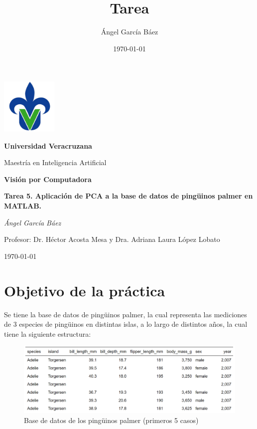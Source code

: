 \documentclass[11pt, letterpaper]{article}
\title{\bfseries Tarea}
\author{Ángel García Báez}
\date{\today}
\begin{document}
	
	\begin{titlepage}
		\centering
		\includegraphics[width=0.2\textwidth]{logo.png}\par
		\vspace{1cm}
		{\LARGE \bfseries Universidad Veracruzana \par}
		\vspace{1cm}
		{\Large Maestría en Inteligencia Artificial\par}
		\vspace{3cm}
		{\LARGE \bfseries Visión por Computadora \par}
		\vspace{1cm}
		{\Large \bfseries Tarea 5. Aplicación de PCA a la base de datos de pingüinos palmer en MATLAB. \par}
		\vfill
		{\Large \textit{Ángel García Báez}\par}
		\vspace{1cm}
		{\Large Profesor: Dr. Héctor Acosta Mesa y Dra. Adriana Laura López Lobato\par}
		\vfill
		{\Large \today \par}
	\end{titlepage}
	
	\newpage
	\tableofcontents
	\newpage
	
\section{Objetivo de la práctica}
	
Se tiene la base de datos de pingüinos palmer, la cual representa las mediciones de 3 especies de pingüinos en distintas islas, a lo largo de distintos años, la cual tiene la siguiente estructura:




\begin{figure}[h!]
	\centering
	\begin{minipage}{1\textwidth}
		\centering
		\includegraphics[width=\textwidth]{IMG/T1.png}
		\caption{Base de datos de los pingüinos palmer (primeros 5 casos)}
		\label{fig:f1}
	\end{minipage}\hfill
\end{figure}
\end{document}
